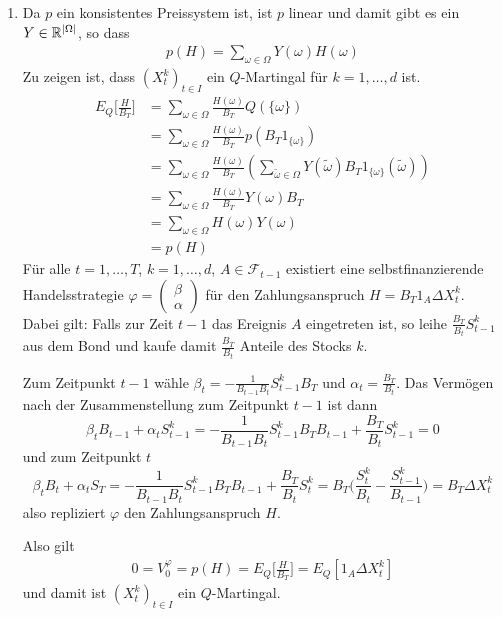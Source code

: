 \documentclass[a4paper,twoside,DIV15,BCOR12mm]{scrbook}
\newcommand{\cF}{\mathcal F}
\begin{document}
\begin{beweis}
\begin{enumerate}
\item Da $p$ ein konsistentes Preissystem ist, ist $p$ linear und damit gibt es ein $Y\in\mathbb{R}^{|\Omega|}$, so dass
\begin{align*}
p(H) = \sum_{\omega\in\Omega} Y(\omega)H(\omega) \tag{$(*)$}
\end{align*}
Zu zeigen ist, dass $(X_t^k)_{t\in I}$ ein $Q$-Martingal für $k=1,\ldots,d$ ist.
\begin{align*}
E_Q\bigg[\frac H{B_T}\bigg] &= 
\sum_{\omega\in \Omega} \frac{H(\omega)}{B_T} Q(\{\omega\}) \\
&= \sum_{\omega\in \Omega} \frac{H(\omega)}{B_T} p(B_T 1_{\{\omega\}}) \\
&= \sum_{\omega\in \Omega} \frac{H(\omega)}{B_T} (\sum_{\tilde\omega\in\Omega} Y(\tilde\omega)  B_T 1_{\{\omega\}}(\tilde\omega))\\
&= \sum_{\omega\in \Omega} \frac{H(\omega)}{B_T}  Y(\omega) B_T \\
&= \sum_{\omega\in \Omega} H(\omega)Y(\omega) \\
&= p(H)
\end{align*}
Für alle $t=1,\ldots,T$, $k=1,\ldots,d$, $A\in \cF_{t-1}$ existiert eine selbstfinanzierende Handelsstrategie
$\varphi=\left(\begin{smallmatrix} \beta \\ \alpha \end{smallmatrix}\right)$
für den Zahlungsanspruch $H=B_T 1_A\Delta X_t^k$. Dabei gilt: Falls zur Zeit $t-1$ das Ereignis $A$ eingetreten ist, so leihe $\frac{B_T}{B_t} S_{t-1}^k$ aus dem Bond und kaufe damit $\frac{B_T}{B_t}$ Anteile des Stocks $k$.

Zum Zeitpunkt $t-1$ wähle $\beta_t = -\frac 1{B_{t-1}B_t} S_{t-1}^k B_T$ und $\alpha_t = \frac{B_T}{B_t}$. Das Vermögen nach der Zusammenstellung zum Zeitpunkt $t-1$ ist dann 
\[\beta_tB_{t-1}+ \alpha_tS_{t-1}^k = -\frac1{B_{t-1}B_t} S_{t-1}^k B_T B_{t-1} + \frac{B_T}{B_t} S_{t-1}^k = 0\]
und zum Zeitpunkt $t$
\[
\beta_t B_t + \alpha_t S_T = - \frac 1{B_{t-1} B_t} S_{t-1}^k B_T B_{t-1} + \frac{B_T}{B_t} S_t^k = B_T\bigg(\frac{S_t^k}{B_t} - \frac{S_{t-1}^k}{B_{t-1}}\bigg) = B_T\Delta X_t^k
\]
also repliziert $\varphi$ den Zahlungsanspruch $H$.

Also gilt 
\begin{align*}
0=V_0^\varphi = p(H) = E_Q\bigg[\frac H{B_T}\bigg] =  E_Q[1_A \Delta X_t^k]
\end{align*}
und damit ist $(X_t^k)_{t\in I}$ ein $Q$-Martingal.


\end{enumerate}
\end{beweis}
\end{document}
